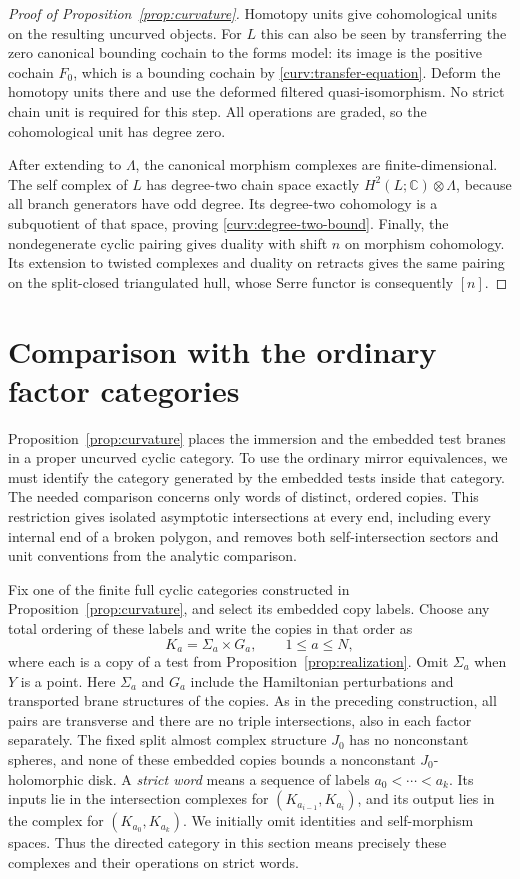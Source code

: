 \documentclass[11pt]{article}
\numberwithin{equation}{section}
\theoremstyle{definition}
\theoremstyle{remark}
\newcommand{\C}{\mathbb C}
\begin{document}
\begin{proof}[Proof of Proposition~\ref{prop:curvature}]
Homotopy units give cohomological units on the resulting uncurved
objects.  For $L$ this can also be seen by transferring the zero
canonical bounding cochain to the forms model: its image is the
positive cochain $F_0$, which is a bounding cochain by
\eqref{curv:transfer-equation}.  Deform the homotopy units there and
use the deformed filtered quasi-isomorphism.  No strict chain unit
is required for this step.  All operations are graded, so the
cohomological unit has degree zero.

After extending to $\Lambda$, the canonical morphism complexes are
finite-dimensional.  The self complex of $L$ has degree-two chain
space exactly $H^2(L;\C)\otimes\Lambda$, because all branch
generators have odd degree.  Its degree-two cohomology is a
subquotient of that space, proving \eqref{curv:degree-two-bound}.
Finally, the nondegenerate cyclic pairing gives duality with shift
$n$ on morphism cohomology.  Its extension to twisted complexes and
duality on retracts gives the same pairing on the split-closed
triangulated hull, whose Serre functor is consequently $[n]$.
\end{proof}

\section{Comparison with the ordinary factor categories}
\label{sec:comparison}

Proposition~\ref{prop:curvature} places the immersion and the embedded
test branes in a proper uncurved cyclic category.  To use the ordinary
mirror equivalences, we must identify the category generated by the
embedded tests inside that category.  The needed comparison concerns
only words of distinct, ordered copies.  This restriction gives isolated
asymptotic intersections at every end, including every internal end of a
broken polygon, and removes both self-intersection sectors and unit
conventions from the analytic comparison.

Fix one of the finite full cyclic categories constructed in
Proposition~\ref{prop:curvature}, and select its embedded copy labels.
Choose any total ordering of these labels and write the copies in that
order as
\[
 K_a=\Sigma_a\times G_a,\qquad 1\leq a\leq N,
\]
where each is a copy of a test from Proposition~\ref{prop:realization}.
Omit $\Sigma_a$ when $Y$ is a point.  Here $\Sigma_a$ and $G_a$ include the Hamiltonian
perturbations and transported brane structures of the copies.  As in
the preceding construction, all pairs are transverse and there are no
triple intersections, also in each factor separately.  The fixed split
almost complex structure $J_0$ has no nonconstant spheres, and none of
these embedded copies bounds a nonconstant $J_0$-holomorphic disk.
A \emph{strict word} means a sequence of labels
$a_0<\cdots<a_k$.  Its inputs lie in the intersection complexes for
$(K_{a_{i-1}},K_{a_i})$, and its output lies in the complex for
$(K_{a_0},K_{a_k})$.  We initially omit identities and self-morphism
spaces.  Thus the directed category in this section means precisely
these complexes and their operations on strict words.
\end{document}
